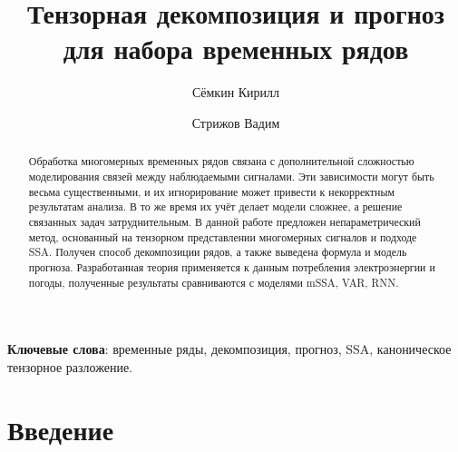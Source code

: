 
\usepackage[backend=biber, sorting=none]{biblatex}
\usepackage{subfigure}
\usepackage{authblk}



\theoremstyle{definition}
\newtheorem*{Def}{Определение}
\theoremstyle{plain}
\newtheorem{Lem}{Лемма}
\newtheorem{Th}{Теорема}

\newcommand{\delayV}[1]{\overset{\leftarrow}{\mathbf{x}}_{#1}}
\newcommand{\delayM}[1]{\overset{\leftarrow}{\mathbf{X}}_{#1}}

\title{Тензорная декомпозиция и прогноз для набора временных рядов}

\author[1]{Сёмкин Кирилл}
\author[2]{Стрижов Вадим}


\date{}


	
	\maketitle
	
	\begin{abstract}
		
		Обработка многомерных временных рядов связана с дополнительной сложностью моделирования связей между наблюдаемыми сигналами. Эти зависимости могут быть весьма существенными, и их игнорирование может привести к некорректным результатам анализа. В то же время их учёт делает модели сложнее, а решение связанных задач затруднительным. В данной работе предложен непараметрический метод, основанный на тензорном представлении многомерных сигналов и подходе SSA. Получен способ декомпозиции рядов, а также выведена формула и модель прогноза. Разработанная теория применяется к данным потребления электроэнергии и погоды, полученные результаты сравниваются с моделями mSSA, VAR, RNN.
		
	\end{abstract}
	
	\textbf{Ключевые слова}: {\small временные ряды, декомпозиция, прогноз, SSA, каноническое тензорное разложение}.
	
	
	\section{Введение}\label{Intro}
	
